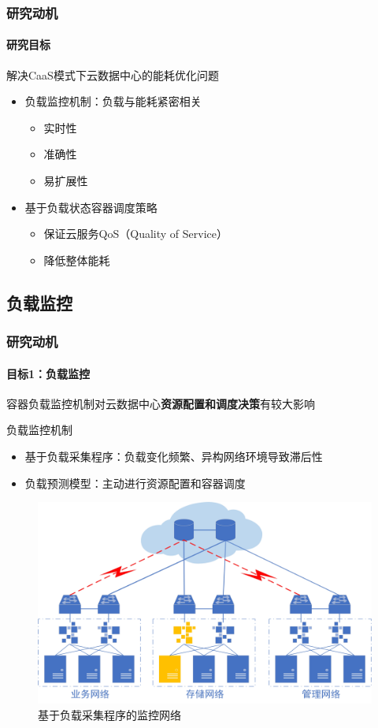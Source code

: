 
\begin{frame}
\frametitle{研究动机}
\framesubtitle{研究目标}
\begin{block}{解决CaaS模式下云数据中心的能耗优化问题}
    \begin{itemize}
        \item 负载监控机制：负载与能耗紧密相关
        \begin{itemize}
            \item 实时性
            \item 准确性
            \item 易扩展性
        \end{itemize}
        \item 基于负载状态容器调度策略
        \begin{itemize}
            \item 保证云服务QoS（Quality of Service）
            \item 降低整体能耗
        \end{itemize}
    \end{itemize}
\end{block}
\end{frame}

\subsection{负载监控}

\begin{frame}
\frametitle{研究动机}
\framesubtitle{目标1：负载监控}
容器负载监控机制对云数据中心\textbf{\alert{资源配置和调度决策}}有较大影响

\begin{block}{负载监控机制}
\begin{itemize}
    \item<1-> 基于负载采集程序：负载变化频繁、异构网络环境导致滞后性
    \item<2-> 负载预测模型：主动进行资源配置和容器调度
\end{itemize}
\end{block}
\begin{figure}[htb]
\centering
    \includegraphics[scale=0.41]{figures/fig3_mmn.jpg}
    \caption{基于负载采集程序的监控网络}
    \label{fig:fig3}
\end{figure}
\end{frame}

